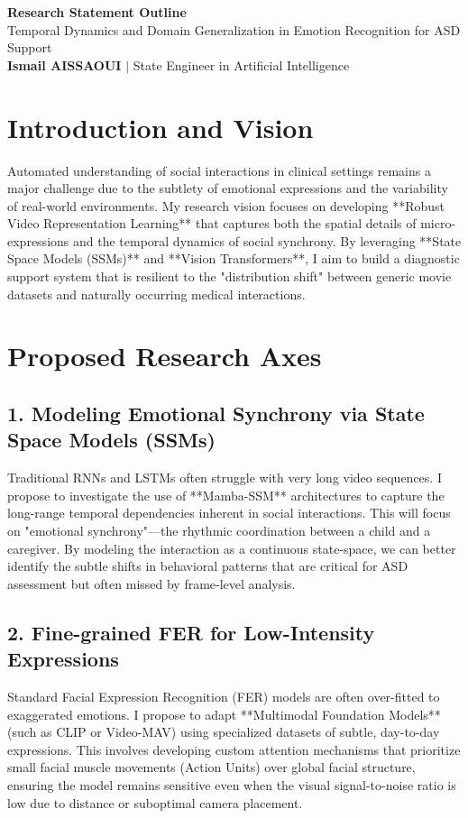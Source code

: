 \documentclass[11pt,a4paper]{article}
\begin{document}
\begin{center}
    {\LARGE\bfseries\color{lyon_red} Research Statement Outline}\\[6pt]
    {\large Temporal Dynamics and Domain Generalization in Emotion Recognition for ASD Support}\\[4pt]
    \textbf{Ismail AISSAOUI} $|$ State Engineer in Artificial Intelligence
\end{center}

\bigskip

\section{Introduction and Vision}
Automated understanding of social interactions in clinical settings remains a major challenge due to the subtlety of emotional expressions and the variability of real-world environments. My research vision focuses on developing **Robust Video Representation Learning** that captures both the spatial details of micro-expressions and the temporal dynamics of social synchrony. By leveraging **State Space Models (SSMs)** and **Vision Transformers**, I aim to build a diagnostic support system that is resilient to the "distribution shift" between generic movie datasets and naturally occurring medical interactions.

\section{Proposed Research Axes}

\subsection{1. Modeling Emotional Synchrony via State Space Models (SSMs)}
Traditional RNNs and LSTMs often struggle with very long video sequences. I propose to investigate the use of **Mamba-SSM** architectures to capture the long-range temporal dependencies inherent in social interactions. This will focus on "emotional synchrony"—the rhythmic coordination between a child and a caregiver. By modeling the interaction as a continuous state-space, we can better identify the subtle shifts in behavioral patterns that are critical for ASD assessment but often missed by frame-level analysis.

\subsection{2. Fine-grained FER for Low-Intensity Expressions}
Standard Facial Expression Recognition (FER) models are often over-fitted to exaggerated emotions. I propose to adapt **Multimodal Foundation Models** (such as CLIP or Video-MAV) using specialized datasets of subtle, day-to-day expressions. This involves developing custom attention mechanisms that prioritize small facial muscle movements (Action Units) over global facial structure, ensuring the model remains sensitive even when the visual signal-to-noise ratio is low due to distance or suboptimal camera placement.
\end{document}
